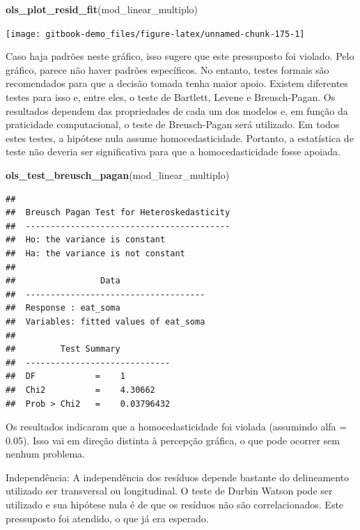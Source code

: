 \documentclass[
]{book}
\newenvironment{Shaded}{\begin{snugshade}}{\end{snugshade}}
\newcommand{\KeywordTok}[1]{\textcolor[rgb]{0.13,0.29,0.53}{\textbf{#1}}}
\newcommand{\NormalTok}[1]{#1}
\begin{document}
\begin{Shaded}
\begin{Highlighting}[]
\KeywordTok{ols_plot_resid_fit}\NormalTok{(mod_linear_multiplo)}
\end{Highlighting}
\end{Shaded}

\begin{center}\texttt{[image: gitbook-demo\_files/figure-latex/unnamed-chunk-175-1]} \end{center}

Caso haja padrões neste gráfico, isso sugere que este pressuposto foi violado. Pelo gráfico, parece não haver padrões específicos. No entanto, testes formais são recomendados para que a decisão tomada tenha maior apoio. Existem diferentes testes para isso e, entre eles, o teste de Bartlett, Levene e Breusch-Pagan. Os resultados dependem das propriedades de cada um dos modelos e, em função da praticidade computacional, o teste de Breusch-Pagan será utilizado. Em todos estes testes, a hipótese nula assume homocedasticidade. Portanto, a estatística de teste não deveria ser significativa para que a homocedasticidade fosse apoiada.

\begin{Shaded}
\begin{Highlighting}[]
\KeywordTok{ols_test_breusch_pagan}\NormalTok{(mod_linear_multiplo)}
\end{Highlighting}
\end{Shaded}

\begin{verbatim}
## 
##  Breusch Pagan Test for Heteroskedasticity
##  -----------------------------------------
##  Ho: the variance is constant            
##  Ha: the variance is not constant        
## 
##                 Data                 
##  ------------------------------------
##  Response : eat_soma 
##  Variables: fitted values of eat_soma 
## 
##         Test Summary          
##  -----------------------------
##  DF            =    1 
##  Chi2          =    4.30662 
##  Prob > Chi2   =    0.03796432
\end{verbatim}

Os resultados indicaram que a homocedasticidade foi violada (assumindo alfa = 0.05). Isso vai em direção distinta à percepção gráfica, o que pode ocorrer sem nenhum problema.

Independência: A independência dos resíduos depende bastante do delineamento utilizado ser transversal ou longitudinal. O teste de Durbin Watson pode ser utilizado e sua hipótese nula é de que os resíduos não são correlacionados. Este pressuposto foi atendido, o que já era esperado.
\end{document}
